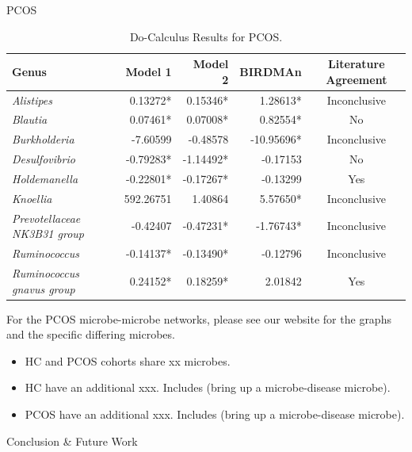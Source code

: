 \documentclass[final]{beamer}
\newlength{\colwidth}
\begin{document}
\begin{frame}[t]
\begin{columns}[t]
\begin{column}{\colwidth}
\begin{block}{PCOS}
    \begin{table}
      \centering
      \begin{tabular}{l r r r c}
        \toprule
        \textbf{Genus} & \textbf{Model 1} & \textbf{Model 2} & \textbf{BIRDMAn} & \textbf{Literature Agreement} \\
        \midrule
        \textit{Alistipes} & 0.13272* & 0.15346* & 1.28613* & Inconclusive \\
        \textit{Blautia} & 0.07461* & 0.07008* & 0.82554* & No \\
        \textit{Burkholderia} & -7.60599 & -0.48578 & -10.95696* & Inconclusive \\
        \textit{Desulfovibrio} & -0.79283* & -1.14492* & -0.17153 & No \\
        \textit{Holdemanella} & -0.22801* & -0.17267* & -0.13299 & Yes \\
        \textit{Knoellia} & 592.26751 & 1.40864 & 5.57650* & Inconclusive \\
        \textit{Prevotellaceae NK3B31 group} & -0.42407 & -0.47231* & -1.76743* & Inconclusive \\
        \textit{Ruminococcus} & -0.14137* & -0.13490* & -0.12796 & Inconclusive \\
        \textit{Ruminococcus gnavus group} & 0.24152* & 0.18259* & 2.01842 & Yes \\
        \bottomrule
      \end{tabular}
      \caption{Do-Calculus Results for PCOS.}
    \end{table}
    
    For the PCOS microbe-microbe networks, please see our website for the graphs and the specific differing microbes. \\
    \begin{itemize}
    	\item HC and PCOS cohorts share xx microbes.
	\item HC have an additional xxx. Includes (bring up a microbe-disease microbe). 
	\item PCOS have an additional xxx. Includes (bring up a microbe-disease microbe). 
    \end{itemize}

  \end{block}
  
  \vspace{0.5cm}

  \begin{block}{Conclusion \& Future Work}
  

\end{block}
\end{column}
\end{columns}
\end{frame}
\end{document}
